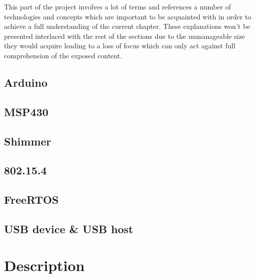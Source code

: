 
	This part of the project involves a lot of terms and references a number of technologies and concepts which are important to be acquainted with in order to achieve a full understanding of the current chapter. These explanations won't be presented interlaced with the rest of the sections due to the unmanageable size they would acquire leading to a loss of focus which can only act against full comprehension of the exposed content.

		\subsection{Arduino}
		\label{ssec:Arduino}
		\subsection{MSP430}
		\subsection{Shimmer}
		\subsection{802.15.4}
		\label{ssec:802.15.4}
		\subsection{FreeRTOS}
		\label{ssec:FreeRTOS}
		\subsection{USB device \& USB host}

	\section{Description}


